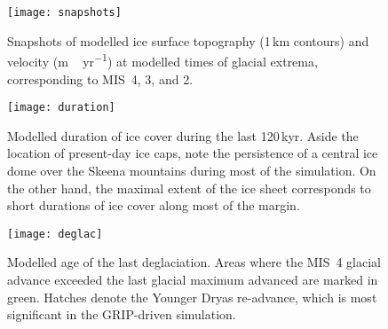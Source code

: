 \documentclass[tc, ms]{copernicus}
\begin{document}
\begin{figure}
  \texttt{[image: snapshots]}
  \caption{Snapshots of modelled ice surface topography (1\,\unit{km} contours)
           and velocity (\unit{m\,yr^{-1}}) at modelled times of glacial
           extrema, corresponding to MIS~4, 3, and 2.}
  \label{fig:snapshots}
\end{figure}

\begin{figure}
  \texttt{[image: duration]}
  \caption{Modelled duration of ice cover during the last 120\,\unit{kyr}.
           Aside the location of present-day ice caps, note the persistence of
           a central ice dome over the Skeena mountains during most of the
           simulation. On the other hand, the maximal extent of the ice sheet
           corresponds to short durations of ice cover along most of the margin.}
  \label{fig:duration}
\end{figure}

\begin{figure}
  \texttt{[image: deglac]}
  \caption{Modelled age of the last deglaciation. Areas where the MIS~4 glacial
           advance exceeded the last glacial maximum advanced are marked in
           green. Hatches denote the Younger Dryas re-advance, which is most
           significant in the GRIP-driven simulation.}
  \label{fig:deglac}
\end{figure}

\end{document}
